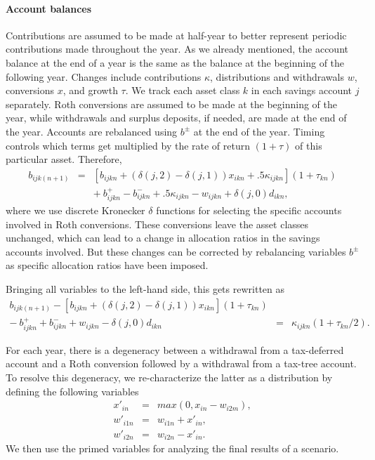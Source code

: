 \documentclass{article}[fleqn,12pt]
\begin{document}
\paragraph*{Account balances}
	Contributions are assumed to be made at half-year to better represent periodic contributions
	made throughout the year. As we already mentioned,
	the account balance at the end of a year is the same as the balance
	at the beginning of the following year.
	Changes include contributions $\kappa$, distributions and withdrawals $w$,
	conversions $x$, and growth $\tau$.
	We track each asset class $k$ in each savings account $j$ separately.
	Roth conversions are assumed to be made at the beginning of the year, while withdrawals
	and surplus deposits, if needed, are made at the end of the year.
	Accounts are rebalanced using $b^{\pm}$ at the end of the year.
	Timing controls which terms get multiplied by the rate of return $(1 + \tau)$
	of this particular asset.
	Therefore,
	\begin{eqnarray}
		\label{Eq:C3a}
		b_{ijk(n+1)} &=& [b_{ijkn} + (\delta(j, 2) - \delta(j, 1))x_{ikn} 
		+ .5\kappa_{ijkn}](1 + \tau_{kn})
		\nonumber \\
		&& 
		+\ b^+_{ijkn} - b^-_{ijkn} 
		+ .5 \kappa_{ijkn} - w_{ijkn} + \delta(j, 0)d_{ikn},
	\end{eqnarray}
	where we use discrete Kronecker $\delta$ functions for selecting the specific accounts involved
	in Roth conversions. These conversions leave the asset classes unchanged, which can lead to a
	change in allocation ratios in the savings accounts involved. But these changes
	can be corrected by rebalancing variables $b^\pm$ as
	specific allocation ratios have been imposed.

	Bringing all variables
	to the left-hand side, this gets rewritten as
	\begin{eqnarray}
		\label{Eq:C3}
		b_{ijk(n+1)} - [b_{ijkn} + (\delta(j, 2) - \delta(j, 1))x_{ikn}](1 + \tau_{kn})
		&& \nonumber \\
		- \ b^+_{ijkn} + b^-_{ijkn} 
		+ w_{ijkn}
		- \delta(j, 0)d_{ikn} 
		&=& \kappa_{ijkn} \left(1 + \tau_{kn}/2\right).
	\end{eqnarray}

	For each year, there is a degeneracy between a withdrawal from a tax-deferred account and a
	Roth conversion followed by a withdrawal from a tax-tree account. To resolve this degeneracy,
	we re-characterize the latter as a distribution by defining the following variables
	\begin{eqnarray}
		x'_{in} &=& max(0, x_{in} - w_{i2m}), \nonumber \\
		w'_{i1n} &=& w_{i1n} + x'_{in}, \nonumber \\
		w'_{i2n} &=& w_{i2n} - x'_{in}.
	\end{eqnarray}
	We then use the primed variables for analyzing the final results of a scenario.
\end{document}
